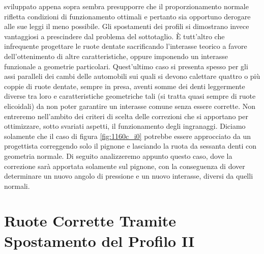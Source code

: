 sviluppato appena sopra sembra presupporre che il proporzionamento normale
rifletta condizioni di funzionamento ottimali e pertanto sia opportuno
derogare alle sue leggi il meno possibile. Gli spostamenti dei profili si
dimostrano invece vantaggiosi a prescindere dal problema del sottotaglio.
\`E tutt'altro che infrequente progettare le ruote dentate sacrificando
l'interasse teorico a favore dell'ottenimento
di altre caratteristiche, oppure imponendo un 
interasse funzionale a geometrie particolari. Quest'ultimo
caso si presenta spesso
per gli assi paralleli dei cambi delle automobili sui quali si devono
calettare quattro o pi\`u coppie di ruote dentate, sempre in presa,
aventi somme
dei denti leggermente diverse tra loro e caratteristiche geometriche tali
(si tratta quasi sempre di ruote elicoidali)
da non poter garantire un interasse comune senza essere corrette.
 Non entreremo nell'ambito dei criteri
di scelta delle correzioni che si apportano per ottimizzare, sotto svariati
aspetti, il funzionamento degli ingranaggi. Diciamo solamente che il caso
di figura \ref{fig:1160c_i0} potrebbe essere approcciato da un progettista 
correggendo solo il pignone e lasciando la ruota da sessanta denti con geometria
normale. Di seguito analizzeremo appunto questo caso, dove la correzione sar\`a
apportata solamente sul pignone, con la conseguenza di dover 
determinare un nuovo angolo di
pressione e un nuovo interasse, diversi da quelli normali.


\section{Ruote Corrette Tramite Spostamento del Profilo II}

